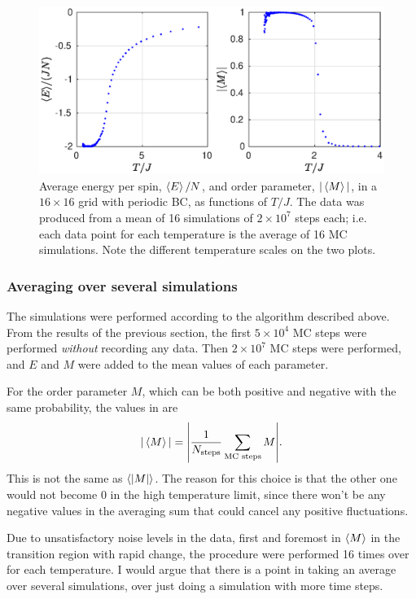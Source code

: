 \documentclass[11pt,letter, swedish, english
]{article}
\begin{document}
\begin{figure}
\centering
\includegraphics[width=1\textwidth]{EM_L-16_Nsteps-2048_Nmean-16.eps}
\caption{Average energy per spin, $\ev{E}/N$, and order parameter,
  $|\ev{M}|$, in a $16\times16$ grid with periodic BC, as functions of
  $T/J$. The data was produced from a mean of 16 simulations of
  $2\times10^7$ steps each; i.e. each data point for each temperature
  is the average of 16 MC simulations. Note the different temperature
  scales on the two plots.} 
\label{fig:EM1}
\end{figure}


\subsubsection{Averaging over several simulations}
\label{sec:sim_avg}
The simulations were performed according to the algorithm described
above. From the results of the previous section, the first
$5\times10^4$ MC steps were performed \emph{without} recording any
data. Then $2\times10^7$ MC steps were performed, and $E$ and $M$ were
added to the mean values of each parameter.

For the order parameter $M$, which can be both positive and negative with
the same probability, the values in  are
\begin{equation}\label{eq:evM}
|\ev{M}| = \abs{\frac{1}{N_\text{steps}} \sum_{\text{MC steps}} M}.
\end{equation}
This is not the same as $\ev{|M|}$. The reason for this choice is that
the other one would not become $0$ in the high temperature limit,
since there won't be any negative values in the averaging sum that
could cancel any positive fluctuations. 

Due to unsatisfactory noise levels in the data, first and foremost in
$\ev{M}$ in the transition region with rapid change, the procedure
were performed 16 times over for each temperature. I would argue that
there is a point in taking an average over several simulations, over
just doing a simulation with more time steps. 
\end{document}
